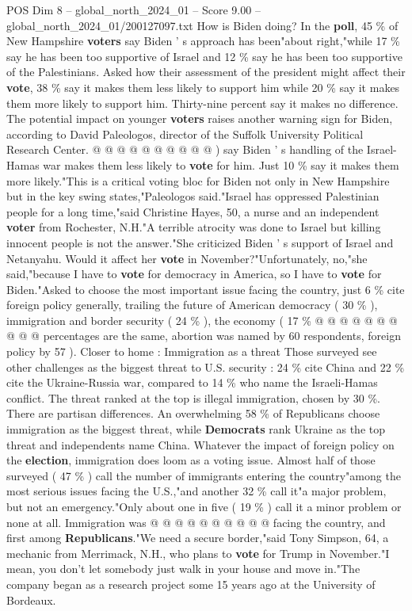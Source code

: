\begin{textsample}{POS Dim 8 – global\_north\_2024\_01 – Score 9.00 – global\_north\_2024\_01/200127097.txt}
How is Biden doing?
In the \textbf{poll}, 45 \% of New Hampshire \textbf{voters} say Biden ' s approach has been"about right,"while 17 \% say he has been too supportive of Israel and 12 \% say he has been too supportive of the Palestinians.
Asked how their assessment of the president might affect their \textbf{vote}, 38 \% say it makes them less likely to support him while 20 \% say it makes them more likely to support him.
Thirty-nine percent say it makes no difference.
The potential impact on younger \textbf{voters} raises another warning sign for Biden, according to David Paleologos, director of the Suffolk University Political Research Center. @ @ @ @ @ @ @ @ @ @ ) say Biden ' s handling of the Israel-Hamas war makes them less likely to \textbf{vote} for him.
Just 10 \% say it makes them more likely."This is a critical voting bloc for Biden not only in New Hampshire but in the key swing states,"Paleologos said."Israel has oppressed Palestinian people for a long time,"said Christine Hayes, 50, a nurse and an independent \textbf{voter} from Rochester, N.H."A terrible atrocity was done to Israel but killing innocent people is not the answer."She criticized Biden ' s support of Israel and Netanyahu.
Would it affect her \textbf{vote} in November?"Unfortunately, no,"she said,"because I have to \textbf{vote} for democracy in America, so I have to \textbf{vote} for Biden."Asked to choose the most important issue facing the country, just 6 \% cite foreign policy generally, trailing the future of American democracy ( 30 \% ), immigration and border security ( 24 \% ), the economy ( 17 \% @ @ @ @ @ @ @ @ @ @ percentages are the same, abortion was named by 60 respondents, foreign policy by 57 ).
Closer to home : Immigration as a threat Those surveyed see other challenges as the biggest threat to U.S. security : 24 \% cite China and 22 \% cite the Ukraine-Russia war, compared to 14 \% who name the Israeli-Hamas conflict.
The threat ranked at the top is illegal immigration, chosen by 30 \%.
There are partisan differences.
An overwhelming 58 \% of Republicans choose immigration as the biggest threat, while \textbf{Democrats} rank Ukraine as the top threat and independents name China.
Whatever the impact of foreign policy on the \textbf{election}, immigration does loom as a voting issue.
Almost half of those surveyed ( 47 \% ) call the number of immigrants entering the country"among the most serious issues facing the U.S.,"and another 32 \% call it"a major problem, but not an emergency."Only about one in five ( 19 \% ) call it a minor problem or none at all.
Immigration was @ @ @ @ @ @ @ @ @ @ facing the country, and first among \textbf{Republicans}."We need a secure border,"said Tony Simpson, 64, a mechanic from Merrimack, N.H., who plans to \textbf{vote} for Trump in November."I mean, you don't let somebody just walk in your house and move in."The company began as a research project some 15 years ago at the University of Bordeaux.

\end{textsample}
